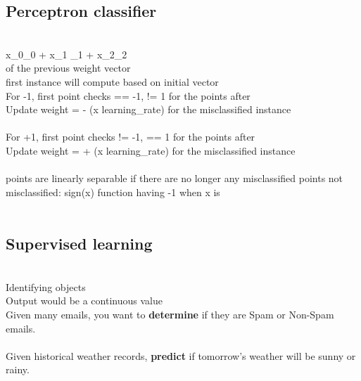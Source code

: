 \documentclass[11pt]{article}
\begin{document}
\subsection*{Perceptron classifier}\\
x_{0}\theta_{0} + x_{1} \theta_{1} + x_{2}\theta_{2}\\\) of the previous weight vector
\\
first instance will compute based on initial vector\\
For -1, first point checks == -1, != 1 for the points after\\
Update weight = - (x \times\) learning\_rate) for the misclassified instance\\
\\\)
For +1, first point checks != -1, == 1 for the points after\\
Update weight =  + (x \times\) learning\_rate) for the misclassified instance\\
\\
points are linearly separable if there are no longer any misclassified points
not misclassified: sign(x) function having -1 when x is 
\\\\
\subsection*{Supervised learning}\\
Identifying objects \\
Output would be a continuous value\\
Given many emails, you want to \textbf{determine} if they are Spam or Non-Spam emails.
\\
\\
Given historical weather records, \textbf{predict} if tomorrow's weather will be sunny or rainy.
\\\\
\end{document}
